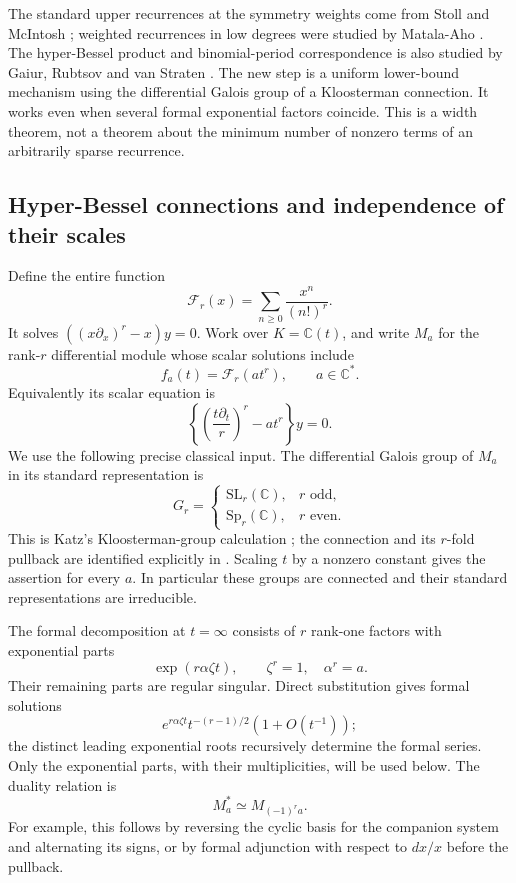 \documentclass[11pt,a4paper]{article}
\theoremstyle{definition}
\theoremstyle{remark}
\numberwithin{equation}{section}
\begin{document}
The standard upper recurrences at the symmetry weights come from
Stoll \cite{p3:Stoll1997} and McIntosh \cite{p3:McIntosh1993}; weighted
recurrences in low degrees were studied by Matala-Aho
\cite{p3:MatalaAho1991}. The hyper-Bessel product and binomial-period
correspondence is also studied by Gaiur, Rubtsov and van Straten
\cite{p7:AW_GRvS}. The new step is a uniform lower-bound mechanism
using the differential Galois group of a Kloosterman connection.
It works even when several formal exponential factors coincide.
This is a width theorem, not a theorem about the minimum number of
nonzero terms of an arbitrarily sparse recurrence.

\subsection{Hyper-Bessel connections and independence of their scales}

Define the entire function
\[
 \mathcal F_r(x)=\sum_{n\ge0}\frac{x^n}{(n!)^r}.
\]
It solves $((x\partial_x)^r-x)y=0$. Work over $K=\mathbb C(t)$,
and write $M_a$ for the rank-$r$ differential module whose scalar
solutions include
\[
 f_a(t)=\mathcal F_r(a t^r),\qquad a\in\mathbb C^*.
\]
Equivalently its scalar equation is
\[
 \left\{\left(\frac{t\partial_t}{r}\right)^r-a t^r\right\}y=0.
\]
We use the following precise classical input. The differential Galois
group of $M_a$ in its standard representation is
\begin{equation}\label{p7:aw:katz}
 G_r=\begin{cases}\mathrm{SL}_r(\mathbb C),&r\text{ odd},\\
                    \mathrm{Sp}_r(\mathbb C),&r\text{ even}.
       \end{cases}
\end{equation}
This is Katz's Kloosterman-group calculation
\cite[Corollary 4.4.8]{p7:AW_Katz}; the connection and its $r$-fold
pullback are identified explicitly in
\cite[Proposition 2.4 and the proof of Proposition 2.7]{p6:FS_FSY2022}.
Scaling $t$ by a nonzero constant gives the assertion for every $a$.
In particular these groups are connected and their standard
representations are irreducible.

The formal decomposition at $t=\infty$ consists of $r$ rank-one
factors with exponential parts
\begin{equation}\label{p7:aw:exp}
 \exp(r\alpha\zeta t),\qquad \zeta^r=1,\quad\alpha^r=a.
\end{equation}
Their remaining parts are regular singular. Direct substitution gives
formal solutions
\[e^{r\alpha\zeta t}t^{-(r-1)/2}(1+O(t^{-1}));\]
the distinct leading exponential roots recursively determine the
formal series. Only the exponential parts, with their multiplicities,
will be used below. The duality relation is
\begin{equation}\label{p7:aw:dual}
 M_a^*\simeq M_{(-1)^r a}.
\end{equation}
For example, this follows by reversing the cyclic basis for the
companion system and alternating its signs, or by formal adjunction
with respect to $dx/x$ before the pullback.
\end{document}
